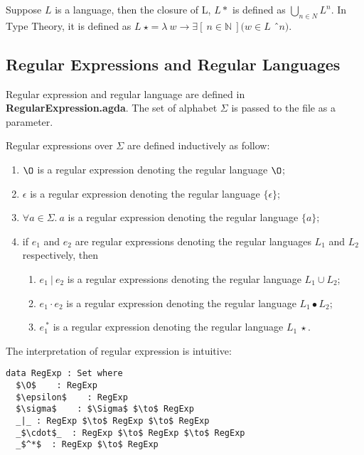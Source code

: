 \begin{defn}
\noindent Suppose \(L\) is a language, then the closure of
L, \(L\ast\) is defined as \(\bigcup_{n \in N} L^n\). In Type
Theory, it is defined as \(L\ \star = \lambda\ w \to \exists [\ n \in \mathbb{N}\
](w \in L\) \^\ \(n)\). 
\end{defn}


\subsection{Regular Expressions and Regular Languages}
\par Regular expression and regular language are defined in
\textbf{RegularExpression.agda}. The set of alphabet \(\Sigma\) is
passed to the file as a parameter. 

\begin{defn}
\noindent Regular expressions over \(\Sigma\) are defined inductively as follow: 
\begin{enumerate}[nolistsep]
  \item \(\O\) is a regular expression denoting the regular language \(\O\);
  \item \(\epsilon\) is a regular expression denoting the regular language \(\{\epsilon\}\);
  \item \(\forall a\in\Sigma.\ a\) is a regular expression denoting the regular language \(\{a\}\);
  \item if \(e_{1}\) and \(e_{2}\) are regular expressions denoting the regular
    languages \(L_1\) and \(L_2\) respectively, then
    \begin{enumerate}[nolistsep]
      \item \(e_{1}\ |\ e_{2}\) is a regular expressions denoting the
        regular language \(L_1 \cup L_2\);
      \item \(e_{1}\cdot e_{2}\) is a regular expression denoting the
        regular language \(L_1\bullet L_2\);
      \item \(e_{1}^{\ *}\) is a regular expression denoting the regular
        language \(L_1\ \star\).
     \end{enumerate}
\end{enumerate}
\end{defn}

\par The interpretation of regular expression is intuitive:

\begin{lstlisting}[mathescape=true,xleftmargin=.3\textwidth]
data RegExp : Set where
  $\O$    : RegExp
  $\epsilon$    : RegExp
  $\sigma$    : $\Sigma$ $\to$ RegExp
  _|_ : RegExp $\to$ RegExp $\to$ RegExp
  _$\cdot$_  : RegExp $\to$ RegExp $\to$ RegExp
  _$^*$  : RegExp $\to$ RegExp
\end{lstlisting} 

